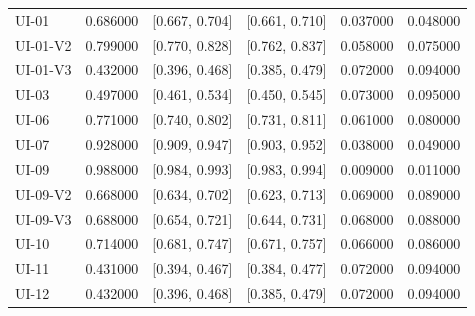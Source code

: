 \begin{tabular}{lrllrr}
UI-01 & 0.686000 & [0.667, 0.704] & [0.661, 0.710] & 0.037000 & 0.048000 \\
UI-01-V2 & 0.799000 & [0.770, 0.828] & [0.762, 0.837] & 0.058000 & 0.075000 \\
UI-01-V3 & 0.432000 & [0.396, 0.468] & [0.385, 0.479] & 0.072000 & 0.094000 \\
UI-03 & 0.497000 & [0.461, 0.534] & [0.450, 0.545] & 0.073000 & 0.095000 \\
UI-06 & 0.771000 & [0.740, 0.802] & [0.731, 0.811] & 0.061000 & 0.080000 \\
UI-07 & 0.928000 & [0.909, 0.947] & [0.903, 0.952] & 0.038000 & 0.049000 \\
UI-09 & 0.988000 & [0.984, 0.993] & [0.983, 0.994] & 0.009000 & 0.011000 \\
UI-09-V2 & 0.668000 & [0.634, 0.702] & [0.623, 0.713] & 0.069000 & 0.089000 \\
UI-09-V3 & 0.688000 & [0.654, 0.721] & [0.644, 0.731] & 0.068000 & 0.088000 \\
UI-10 & 0.714000 & [0.681, 0.747] & [0.671, 0.757] & 0.066000 & 0.086000 \\
UI-11 & 0.431000 & [0.394, 0.467] & [0.384, 0.477] & 0.072000 & 0.094000 \\
UI-12 & 0.432000 & [0.396, 0.468] & [0.385, 0.479] & 0.072000 & 0.094000 \\
\bottomrule
\end{tabular}

